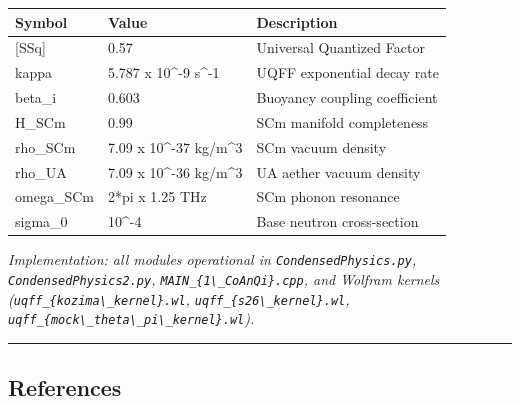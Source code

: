 {\def\LTcaptype{none} %
\begin{longtable}[]{@{}lll@{}}
\toprule\noalign{}
Symbol & Value & Description \\
\midrule\noalign{}
\endhead
\bottomrule\noalign{}
\endlastfoot
{[}SSq{]} & 0.57 & Universal Quantized Factor \\
kappa & 5.787 x 10\^{}-9 s\^{}-1 & UQFF exponential decay rate \\
beta\_i & 0.603 & Buoyancy coupling coefficient \\
H\_SCm & 0.99 & SCm manifold completeness \\
rho\_SCm & 7.09 x 10\^{}-37 kg/m\^{}3 & SCm vacuum density \\
rho\_UA & 7.09 x 10\^{}-36 kg/m\^{}3 & UA aether vacuum density \\
omega\_SCm & 2*pi x 1.25 THz & SCm phonon resonance \\
sigma\_0 & 10\^{}-4 & Base neutron cross-section \\
\end{longtable}
}

\emph{Implementation: all modules operational in
\texttt{CondensedPhysics.py}, \texttt{CondensedPhysics2.py},
\texttt{MAIN\_\{1\textbackslash{}\_CoAnQi\}.cpp}, and Wolfram kernels
(\texttt{uqff\_\{kozima\textbackslash{}\_kernel\}.wl},
\texttt{uqff\_\{s26\textbackslash{}\_kernel\}.wl},
\texttt{uqff\_\{mock\textbackslash{}\_theta\textbackslash{}\_pi\textbackslash{}\_kernel\}.wl}).}

\begin{center}\rule{0.5\linewidth}{0.5pt}\end{center}

\subsection{References}\label{references-1}

